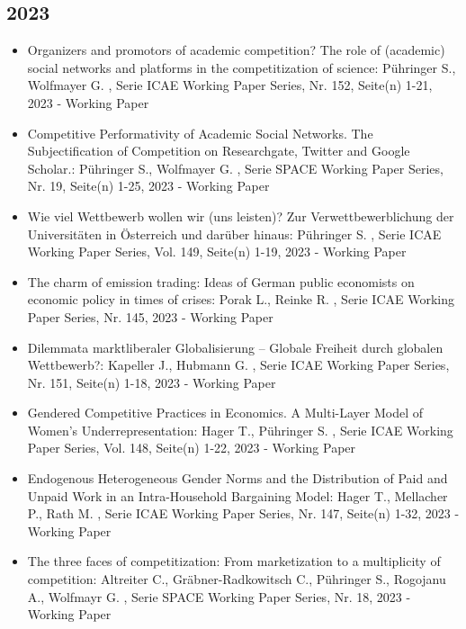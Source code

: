 \begin{itemize}
\end{itemize} 
 \subsection{2023} 
 \begin{itemize} 
	 \item Organizers and promotors of academic competition? The role of (academic) social networks and platforms in the competitization of science: Pühringer S., Wolfmayer G. , Serie ICAE Working Paper Series, Nr. 152, Seite(n) 1-21, 2023 - Working Paper
	 \item Competitive Performativity of Academic Social Networks. The Subjectification of Competition on Researchgate, Twitter and Google Scholar.: Pühringer S., Wolfmayer G. , Serie SPACE Working Paper Series, Nr. 19, Seite(n) 1-25, 2023 - Working Paper
	 \item Wie viel Wettbewerb wollen wir (uns leisten)? Zur Verwettbewerblichung der Universitäten in Österreich und darüber hinaus: Pühringer S. , Serie ICAE Working Paper Series, Vol. 149, Seite(n) 1-19, 2023 - Working Paper
	 \item The charm of emission trading: Ideas of German public economists on economic policy in times of crises: Porak L., Reinke R. , Serie ICAE Working Paper Series, Nr. 145, 2023 - Working Paper
	 \item Dilemmata marktliberaler Globalisierung – Globale Freiheit durch globalen Wettbewerb?: Kapeller J., Hubmann G. , Serie ICAE Working Paper Series, Nr. 151, Seite(n) 1-18, 2023 - Working Paper
	 \item Gendered Competitive Practices in Economics. A Multi-Layer Model of Women’s Underrepresentation: Hager T., Pühringer S. , Serie ICAE Working Paper Series, Vol. 148, Seite(n) 1-22, 2023 - Working Paper
	 \item Endogenous Heterogeneous Gender Norms and the Distribution of Paid and Unpaid Work in an Intra-Household Bargaining Model: Hager T., Mellacher P., Rath M. , Serie ICAE Working Paper Series, Nr. 147, Seite(n) 1-32, 2023 - Working Paper
	 \item The three faces of competitization: From marketization to a multiplicity of competition: Altreiter C., Gräbner-Radkowitsch C., Pühringer S., Rogojanu A., Wolfmayr G. , Serie SPACE Working Paper Series, Nr. 18, 2023 - Working Paper
\end{itemize} 
